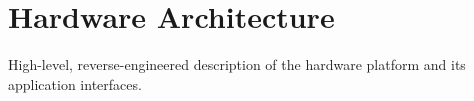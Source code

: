 \chapter{Hardware Architecture}

High-level, reverse-engineered description of the hardware platform and its application interfaces.
